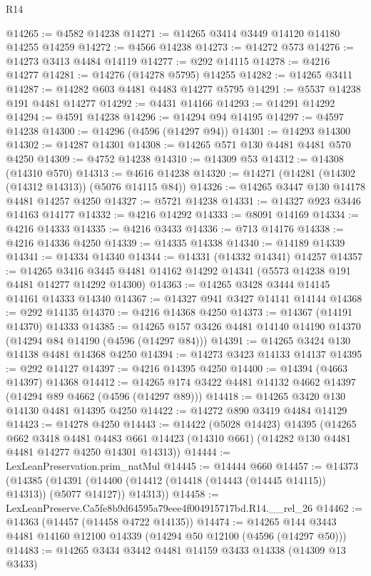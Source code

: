 \begin{lexlean}{R14}
\begin{coremodule}
@14265 := @4582 @14238
@14271 := @14265 @3414 @3449 @14120 @14180 @14255 @14259
@14272 := @4566 @14238
@14273 := @14272 @573
@14276 := @14273 @3413 @4484 @14119
@14277 := @292 @14115
@14278 := @4216 @14277
@14281 := @14276 (@14278 @5795) @14255
@14282 := @14265 @3411
@14287 := @14282 @603 @4481 @4483 @14277 @5795
@14291 := @5537 @14238 @191 @4481 @14277
@14292 := @4431 @14166
@14293 := @14291 @14292
@14294 := @4591 @14238
@14296 := @14294 @94 @14195
@14297 := @4597 @14238
@14300 := @14296 (@4596 (@14297 @94))
@14301 := @14293 @14300
@14302 := @14287 @14301
@14308 := @14265 @571 @130 @4481 @4481 @570 @4250
@14309 := @4752 @14238
@14310 := @14309 @53
@14312 := @14308 (@14310 @570)
@14313 := @4616 @14238
@14320 := @14271 (@14281 (@14302 (@14312 @14313)) (@5076 @14115 @84))
@14326 := @14265 @3447 @130 @14178 @4481 @14257 @4250
@14327 := @5721 @14238
@14331 := @14327 @923 @3446 @14163 @14177
@14332 := @4216 @14292
@14333 := @8091 @14169
@14334 := @4216 @14333
@14335 := @4216 @3433
@14336 := @713 @14176
@14338 := @4216 @14336 @4250
@14339 := @14335 @14338
@14340 := @14189 @14339
@14341 := @14334 @14340
@14344 := @14331 (@14332 @14341) @14257
@14357 := @14265
    @3416
    @3445
    @4481
    @14162
    @14292
    @14341
    (@5573 @14238 @191 @4481 @14277 @14292 @14300)
@14363 := @14265 @3428 @3444 @14145 @14161 @14333 @14340
@14367 := @14327 @941 @3427 @14141 @14144
@14368 := @292 @14135
@14370 := @4216 @14368 @4250
@14373 := @14367 (@14191 @14370) @14333
@14385 := @14265 @157 @3426 @4481 @14140 @14190 @14370 (@14294 @84 @14190 (@4596 (@14297 @84)))
@14391 := @14265 @3424 @130 @14138 @4481 @14368 @4250
@14394 := @14273 @3423 @14133 @14137
@14395 := @292 @14127
@14397 := @4216 @14395 @4250
@14400 := @14394 (@4663 @14397) @14368
@14412 := @14265 @174 @3422 @4481 @14132 @4662 @14397 (@14294 @89 @4662 (@4596 (@14297 @89)))
@14418 := @14265 @3420 @130 @14130 @4481 @14395 @4250
@14422 := @14272 @890 @3419 @4484 @14129
@14423 := @14278 @4250
@14443 := @14422
    (@5028 @14423)
    @14395
    (@14265
      @662
      @3418
      @4481
      @4483
      @661
      @14423
      (@14310 @661)
      (@14282 @130 @4481 @4481 @14277 @4250 @14301 @14313))
@14444 := LexLeanPreservation.prim_natMul
@14445 := @14444 @660
@14457 := @14373
    (@14385
      (@14391 (@14400 (@14412 (@14418 (@14443 (@14445 @14115)) @14313)) (@5077 @14127)) @14313))
@14458 := LexLeanPreserve.Ca5fe8b9d64595a79eee4f004915717bd.R14.__rel_26
@14462 := @14363 (@14457 (@14458 @4722 @14135))
@14474 := @14265 @144 @3443 @4481 @14160 @12100 @14339 (@14294 @50 @12100 (@4596 (@14297 @50)))
@14483 := @14265 @3434 @3442 @4481 @14159 @3433 @14338 (@14309 @13 @3433)

\end{coremodule}
\end{lexlean}
